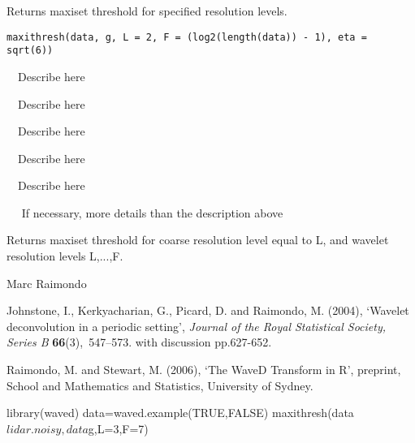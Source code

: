 \begin{Description}\relax
Returns maxiset threshold for specified resolution levels.
\end{Description}
\begin{Usage}
\begin{verbatim}
maxithresh(data, g, L = 2, F = (log2(length(data)) - 1), eta = sqrt(6))
\end{verbatim}
\end{Usage}
\begin{Arguments}
\begin{ldescription}
\item[\code{data}] ~~Describe  here~~ 
\item[\code{g}] ~~Describe  here~~ 
\item[\code{L}] ~~Describe  here~~ 
\item[\code{F}] ~~Describe  here~~ 
\item[\code{eta}] ~~Describe  here~~ 
\end{ldescription}
\end{Arguments}
\begin{Details}\relax
~~ If necessary, more details than the description above ~~
\end{Details}
\begin{Value}
Returns maxiset threshold for coarse resolution level equal to L, 
and wavelet resolution levels L,...,F.
\end{Value}
\begin{Author}\relax
Marc Raimondo
\end{Author}
\begin{References}\relax
Johnstone, I., Kerkyacharian, G., Picard, D. and Raimondo, M.  (2004), 
`Wavelet deconvolution in a periodic
setting', {\em Journal of the Royal Statistical Society, Series B} {\bf
66}(3),~547--573.  with discussion pp.627-652.

Raimondo, M. and Stewart, M. (2006),
`The WaveD Transform in R', preprint, School and Mathematics and Statistics,
University of Sydney.
\end{References}
\begin{SeeAlso}\relax
{}
\end{SeeAlso}
\begin{Examples}
\begin{ExampleCode}
library(waved)
data=waved.example(TRUE,FALSE)
maxithresh(data$lidar.noisy,data$g,L=3,F=7)
\end{ExampleCode}
\end{Examples}

